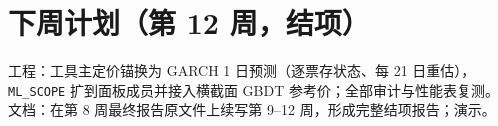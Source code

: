 \documentclass[11pt]{ctexart}
\begin{document}
\section{下周计划（第 12 周，结项）}
工程：工具主定价锚换为 GARCH 1 日预测（逐票存状态、每 21 日重估），\texttt{ML\_SCOPE} 扩到面板成员并接入横截面 GBDT 参考价；全部审计与性能表复测。文档：在第 8 周最终报告原文件上续写第 9--12 周，形成完整结项报告；演示。
\end{document}
